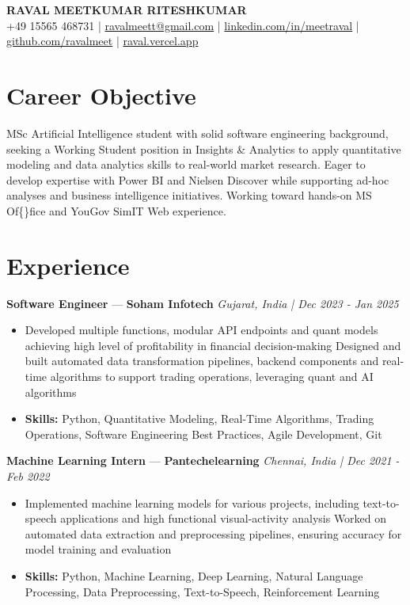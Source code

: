 \documentclass[a4paper,10pt]{article}
\begin{document}
\begin{center}
  {\Large\bfseries RAVAL MEETKUMAR RITESHKUMAR}\\[2pt]
  {\small +49 15565 468731 \;|\; \href{mailto:ravalmeett@gmail.com}{ravalmeett@gmail.com} \;|\; \href{https://www.linkedin.com/in/meetraval/}{linkedin.com/in/meetraval} \;|\; \href{https://github.com/ravalmeet}{github.com/ravalmeet} \;|\; \href{https://raval.vercel.app/}{raval.vercel.app}}
\end{center}
\vspace{-3pt}

\section*{Career Objective}
MSc Artificial Intelligence student with solid software engineering background, seeking a Working Student position in Insights \& Analytics to apply quantitative modeling and data analytics skills to real-world market research. Eager to develop expertise with Power BI and Nielsen Discover while supporting ad-hoc analyses and business intelligence initiatives. Working toward hands-on MS Of\{\}fice and YouGov SimIT Web experience.\par

\section*{Experience}
\textbf{Software Engineer} — \textbf{Soham Infotech} \hfill \textit{Gujarat, India \;|\; Dec 2023 - Jan 2025}\par
\vspace{1pt}
\begin{itemize}
  \item Developed multiple functions, modular API endpoints and quant models achieving high level of profitability in financial decision-making Designed and built automated data transformation pipelines, backend components and real-time algorithms to support trading operations, leveraging quant and AI algorithms
  \item \textbf{Skills:} Python, Quantitative Modeling, Real-Time Algorithms, Trading Operations, Software Engineering Best Practices, Agile Development, Git
\end{itemize}
\vspace{3pt}
\textbf{Machine Learning Intern} — \textbf{Pantechelearning} \hfill \textit{Chennai, India \;|\; Dec 2021 - Feb 2022}\par
\vspace{1pt}
\begin{itemize}
  \item Implemented machine learning models for various projects, including text-to-speech applications and high functional visual-activity analysis Worked on automated data extraction and preprocessing pipelines, ensuring accuracy for model training and evaluation
  \item \textbf{Skills:} Python, Machine Learning, Deep Learning, Natural Language Processing, Data Preprocessing, Text-to-Speech, Reinforcement Learning
\end{itemize}
\end{document}
